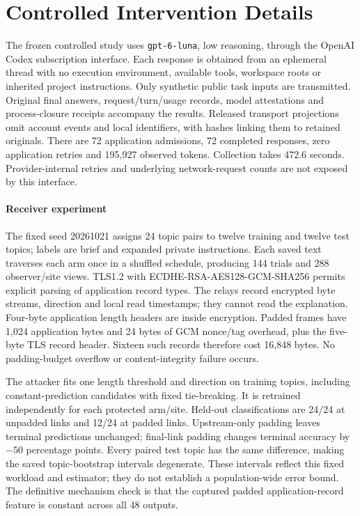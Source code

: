 \section{Controlled Intervention Details}\label{app:controlled-details}
The frozen controlled study uses \texttt{gpt-6-luna}, low reasoning, through the OpenAI Codex subscription interface. Each response is obtained from an ephemeral thread with no execution environment, available tools, workspace roots or inherited project instructions. Only synthetic public task inputs are transmitted. Original final answers, request/turn/usage records, model attestations and process-closure receipts accompany the results. Released transport projections omit account events and local identifiers, with hashes linking them to retained originals. There are 72 application admissions, 72 completed responses, zero application retries and 195,927 observed tokens. Collection takes 472.6 seconds. Provider-internal retries and underlying network-request counts are not exposed by this interface.

\paragraph{Receiver experiment}
The fixed seed 20261021 assigns 24 topic pairs to twelve training and twelve test topics; labels are brief and expanded private instructions. Each saved text traverses each arm once in a shuffled schedule, producing 144 trials and 288 observer/site views. TLS1.2 with ECDHE-RSA-AES128-GCM-SHA256 permits explicit parsing of application record types. The relays record encrypted byte streams, direction and local read timestamps; they cannot read the explanation. Four-byte application length headers are inside encryption. Padded frames have 1,024 application bytes and 24 bytes of GCM nonce/tag overhead, plus the five-byte TLS record header. Sixteen such records therefore cost 16,848 bytes. No padding-budget overflow or content-integrity failure occurs.

The attacker fits one length threshold and direction on training topics, including constant-prediction candidates with fixed tie-breaking. It is retrained independently for each protected arm/site. Held-out classifications are 24/24 at unpadded links and 12/24 at padded links. Upstream-only padding leaves terminal predictions unchanged; final-link padding changes terminal accuracy by $-50$ percentage points. Every paired test topic has the same difference, making the saved topic-bootstrap intervals degenerate. These intervals reflect this fixed workload and estimator; they do not establish a population-wide error bound. The definitive mechanism check is that the captured padded application-record feature is constant across all 48 outputs.

